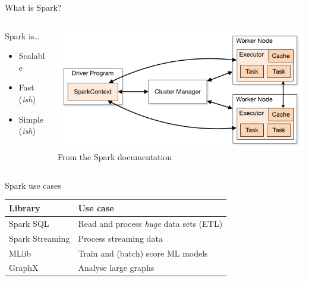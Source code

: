 \documentclass[12pt,aspectratio=169]{beamer}
\begin{document}
\begin{frame}{What is Spark?}
    \begin{columns}
        \begin{column}{0.4\textwidth}
            Spark is\ldots
            \begin{itemize}
                \item Scalable
                \item Fast (\textit{ish})
                \item Simple (\textit{ish})
            \end{itemize}
        \end{column}
        \begin{column}{0.6\textwidth}
            \begin{center}
                \includegraphics[width=\textwidth]{figures/spark-components} \\
                {\scriptsize%
                 From the Spark documentation}
            \end{center}
        \end{column}
    \end{columns}
\end{frame}

\begin{frame}{Spark use cases}
    \centering
    \begin{tabular}{ll}
        \toprule
        \textbf{Library} & \textbf{Use case}                            \\
        \midrule
        Spark SQL        & Read and process \emph{huge} data sets (ETL) \\
        Spark Streaming  & Process streaming data                       \\
        MLlib            & Train and (batch) score ML models            \\
        GraphX           & Analyse large graphs                         \\
        \bottomrule
    \end{tabular}
\end{frame}
\end{document}
